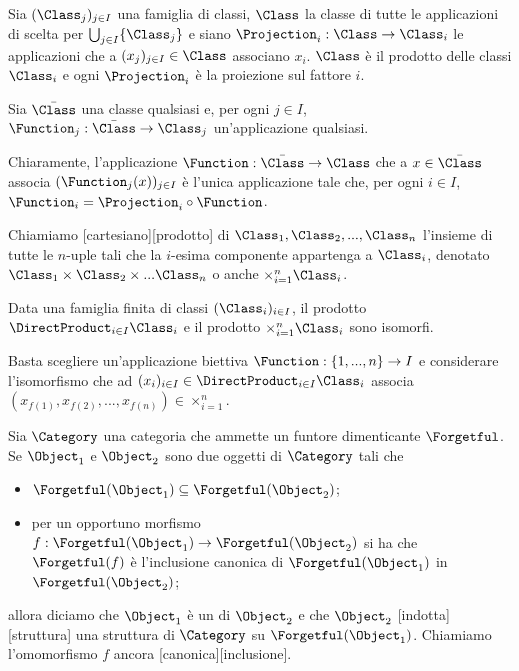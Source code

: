 \begin{Theorem}
	Sia $(\Class_j)_{j \in I}$ una famiglia di classi, $\Class$ la classe di tutte le applicazioni di scelta per $\bigcup_{j \in I} \lbrace \Class_j \rbrace$ e siano $\Projection_i: \Class \rightarrow \Class_i$ le applicazioni che a $(x_j)_{j \in I} \in \Class$ associano $x_i$. $\Class$ \`e il prodotto delle classi $\Class_i$ e ogni $\Projection_i$ \`e la proiezione sul fattore $i$.
\end{Theorem}
\Proof Sia $\bar{\Class}$ una classe qualsiasi e, per ogni $j \in I$, $\Function_j: \bar{\Class} \rightarrow \Class_j$ un'applicazione qualsiasi.
\par Chiaramente, l'applicazione $\Function: \bar{\Class} \rightarrow \Class$ che a $x \in \bar{\Class}$ associa $(\Function_j(x))_{j \in I}$ \`e l'unica applicazione tale che, per ogni $i \in I$, $\Function_i = \Projection_i \circ \Function$. \EndProof
\begin{Definition}
	Chiamiamo [cartesiano][prodotto] di $\Class_1, \Class_2,  ..., \Class_n$ l'insieme di tutte le $n$-uple tali che la $i$-esima componente appartenga a $\Class_i$, denotato $\Class_1 \times \Class_2 \times ... \Class_n$ o anche $\times_{i = 1}^n \Class_i$.
\end{Definition}
\begin{Theorem}
	Data una famiglia finita di classi $(\Class_i)_{i \in I}$, il prodotto $\DirectProduct_{i \in I} \Class_i$ e il prodotto $\times_{i = 1}^n \Class_i$ sono isomorfi.
\end{Theorem}
\Proof Basta scegliere un'applicazione biettiva $\Function: \lbrace 1, ..., n \rbrace \rightarrow I$ e considerare l'isomorfismo che ad $(x_i)_{i \in I} \in \DirectProduct_{i \in I} \Class_i$ associa $(x_{f(1)},x_{f(2)}, ..., x_{f(n)}) \in \times_{i = 1}^n$. \EndProof
\begin{Definition}
	Sia $\Category$ una categoria che ammette un funtore dimenticante $\Forgetful$. Se $\Object_1$ e $\Object_2$ sono due oggetti di $\Category$ tali che
	\begin{itemize}
		\item $\Forgetful(\Object_1) \subseteq \Forgetful(\Object_2)$;
		\item per un opportuno morfismo $f: \Forgetful(\Object_1) \rightarrow \Forgetful(\Object_2)$ si ha che $\Forgetful(f)$ \`e l'inclusione canonica di $\Forgetful(\Object_1)$ in $\Forgetful(\Object_2)$;
	\end{itemize}
	allora diciamo che $\Object_1$ \`e un  di $\Object_2$ e che $\Object_2$ [indotta][struttura] una struttura di $\Category$ su $\Forgetful(\Object_1)$. Chiamiamo l'omomorfismo $f$ ancora [canonica][inclusione].
\end{Definition}
